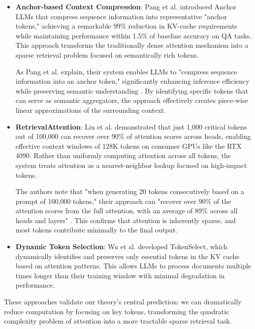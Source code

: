 \documentclass{article}
\begin{document}
\begin{itemize}
\item \textbf{Anchor-based Context Compression}: Pang et al. \citep{pang2024anchor} introduced Anchor LLMs that compress sequence information into representative "anchor tokens," achieving a remarkable 99\% reduction in KV-cache requirements while maintaining performance within 1.5\% of baseline accuracy on QA tasks. This approach transforms the traditionally dense attention mechanism into a sparse retrieval problem focused on semantically rich tokens.

  As Pang et al. explain, their system enables LLMs to "compress sequence information into an anchor token," significantly enhancing inference efficiency while preserving semantic understanding \citep{pang2024anchor}. By identifying specific tokens that can serve as semantic aggregators, the approach effectively creates piece-wise linear approximations of the surrounding context.

\item \textbf{RetrievalAttention}: Liu et al. \citep{liu2024retrieval} demonstrated that just 1,000 critical tokens out of 100,000 can recover over 90\% of attention scores across heads, enabling effective context windows of 128K tokens on consumer GPUs like the RTX 4090. Rather than uniformly computing attention across all tokens, the system treats attention as a nearest-neighbor lookup focused on high-impact tokens.

  The authors note that "when generating 20 tokens consecutively based on a prompt of 100,000 tokens," their approach can "recover over 90\% of the attention scores from the full attention, with an average of 89\% across all heads and layers" \citep{liu2024retrieval}. This confirms that attention is inherently sparse, and most tokens contribute minimally to the final output.

\item \textbf{Dynamic Token Selection}: Wu et al. \citep{wu2024tokenselect} developed TokenSelect, which dynamically identifies and preserves only essential tokens in the KV cache based on attention patterns. This allows LLMs to process documents multiple times longer than their training window with minimal degradation in performance.
\end{itemize}

These approaches validate our theory's central prediction: we can dramatically reduce computation by focusing on key tokens, transforming the quadratic complexity problem of attention into a more tractable sparse retrieval task.
\end{document}
